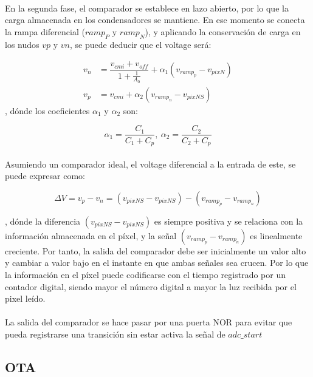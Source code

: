 \paragraph{}
En la segunda fase, el comparador se establece en lazo abierto, por lo que la carga
almacenada en los condensadores se mantiene. En ese momento se conecta la
rampa diferencial ($ramp_P$ y $ramp_N$), y aplicando la conservación de carga en los
nudos $vp$ y $vn$, se puede deducir que el voltage será:

\begin{align}
	v_n &= \dfrac{v_{cmi} + v_{off}}{1+\frac{1}{A_0}} + \alpha_1 (v_{ramp_p}-v_{pixN})\\
	v_p &= v_{cmi} + \alpha_2 (v_{ramp_n}-v_{pixNS})
\end{align}
, dónde los coeficientes $\alpha_1$ y $\alpha_2$ son:

\begin{equation}
	\alpha_1 = \dfrac{C_1}{C_1+C_p},~
	\alpha_2 = \dfrac{C_2}{C_2+C_p}
\end{equation}

\paragraph{}
Asumiendo un comparador ideal, el voltage diferencial a la entrada de este, se
puede expresar como:

\begin{equation}
	\Delta V= v_p - v_n = (v_{pixNS}-v_{pixNS}) - (v_{ramp_p}-v_{ramp_n})
\end{equation}

, dónde la diferencia $(v_{pixNS}-v_{pixNS})$ es siempre positiva y se relaciona
con la información almacenada en el píxel, y la señal $(v_{ramp_p}-v_{ramp_n})$ es
linealmente creciente. Por tanto, la salida del comparador debe ser inicialmente
un valor alto y cambiar a valor bajo en el instante en que ambas señales sea crucen.
Por lo que la información en el píxel puede codificarse con el tiempo registrado
por un contador digital, siendo mayor el número digital a mayor la luz recibida
por el pixel leído.

\paragraph{}
La salida del comparador se hace pasar por una puerta NOR para evitar que pueda
registrarse una transición sin estar activa la señal de $adc\_start$

\subsection{OTA}\label{cap:ro_sch_ota}

